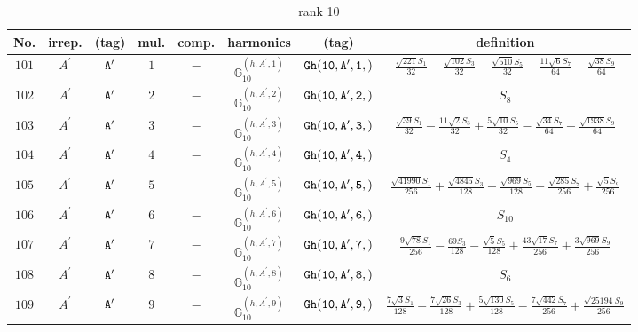 \documentclass[fleqn,8pt]{jsarticle}
\begin{document}
\begin{table}[ht!]
\begin{center}
\caption{rank 10}
\renewcommand{\arraystretch}{1.3}
\begin{tabular}{cccccccc} \hline \hline
No. & irrep. & (tag) & mul. & comp. & harmonics & (tag) & definition \\ \hline
$ 101 $ & $ A^{\prime} $ & $ {\tt A'} $ & $ 1 $ & $ - $ & $ \mathbb{G}_{10}^{(h,A^{\prime},1)} $ & $ {\tt Gh(10,A',1,)} $ & $ \frac{\sqrt{221} S_{1}}{32} - \frac{\sqrt{102} S_{3}}{32} - \frac{\sqrt{510} S_{5}}{32} - \frac{11 \sqrt{6} S_{7}}{64} - \frac{\sqrt{38} S_{9}}{64} $ \\
$ 102 $ & $ A^{\prime} $ & $ {\tt A'} $ & $ 2 $ & $ - $ & $ \mathbb{G}_{10}^{(h,A^{\prime},2)} $ & $ {\tt Gh(10,A',2,)} $ & $ S_{8} $ \\
$ 103 $ & $ A^{\prime} $ & $ {\tt A'} $ & $ 3 $ & $ - $ & $ \mathbb{G}_{10}^{(h,A^{\prime},3)} $ & $ {\tt Gh(10,A',3,)} $ & $ \frac{\sqrt{39} S_{1}}{32} - \frac{11 \sqrt{2} S_{3}}{32} + \frac{5 \sqrt{10} S_{5}}{32} - \frac{\sqrt{34} S_{7}}{64} - \frac{\sqrt{1938} S_{9}}{64} $ \\
$ 104 $ & $ A^{\prime} $ & $ {\tt A'} $ & $ 4 $ & $ - $ & $ \mathbb{G}_{10}^{(h,A^{\prime},4)} $ & $ {\tt Gh(10,A',4,)} $ & $ S_{4} $ \\
$ 105 $ & $ A^{\prime} $ & $ {\tt A'} $ & $ 5 $ & $ - $ & $ \mathbb{G}_{10}^{(h,A^{\prime},5)} $ & $ {\tt Gh(10,A',5,)} $ & $ \frac{\sqrt{41990} S_{1}}{256} + \frac{\sqrt{4845} S_{3}}{128} + \frac{\sqrt{969} S_{5}}{128} + \frac{\sqrt{285} S_{7}}{256} + \frac{\sqrt{5} S_{9}}{256} $ \\
$ 106 $ & $ A^{\prime} $ & $ {\tt A'} $ & $ 6 $ & $ - $ & $ \mathbb{G}_{10}^{(h,A^{\prime},6)} $ & $ {\tt Gh(10,A',6,)} $ & $ S_{10} $ \\
$ 107 $ & $ A^{\prime} $ & $ {\tt A'} $ & $ 7 $ & $ - $ & $ \mathbb{G}_{10}^{(h,A^{\prime},7)} $ & $ {\tt Gh(10,A',7,)} $ & $ \frac{9 \sqrt{78} S_{1}}{256} - \frac{69 S_{3}}{128} - \frac{\sqrt{5} S_{5}}{128} + \frac{43 \sqrt{17} S_{7}}{256} + \frac{3 \sqrt{969} S_{9}}{256} $ \\
$ 108 $ & $ A^{\prime} $ & $ {\tt A'} $ & $ 8 $ & $ - $ & $ \mathbb{G}_{10}^{(h,A^{\prime},8)} $ & $ {\tt Gh(10,A',8,)} $ & $ S_{6} $ \\
$ 109 $ & $ A^{\prime} $ & $ {\tt A'} $ & $ 9 $ & $ - $ & $ \mathbb{G}_{10}^{(h,A^{\prime},9)} $ & $ {\tt Gh(10,A',9,)} $ & $ \frac{7 \sqrt{3} S_{1}}{128} - \frac{7 \sqrt{26} S_{3}}{128} + \frac{5 \sqrt{130} S_{5}}{128} - \frac{7 \sqrt{442} S_{7}}{256} + \frac{\sqrt{25194} S_{9}}{256} $ \\

\end{tabular}
\end{center}
\end{table}
\end{document}
